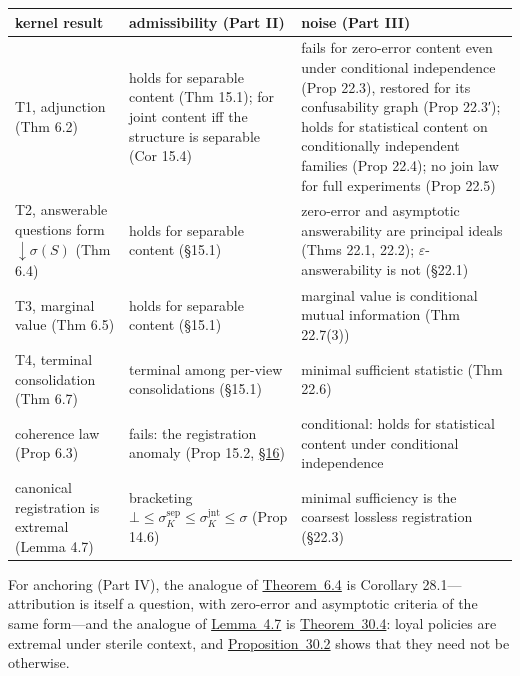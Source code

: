 {\def\LTcaptype{none} %
\begin{longtable}[]{@{}
  >{\raggedright\arraybackslash}p{}
  >{\raggedright\arraybackslash}p{}
  >{\raggedright\arraybackslash}p{}@{}}
\toprule\noalign{}
\begin{minipage}[b]{\linewidth}\raggedright
kernel result
\end{minipage} & \begin{minipage}[b]{\linewidth}\raggedright
admissibility (Part II)
\end{minipage} & \begin{minipage}[b]{\linewidth}\raggedright
noise (Part III)
\end{minipage} \\
\midrule\noalign{}
\endhead
\bottomrule\noalign{}
\endlastfoot
T1, adjunction (Thm 6.2) & holds for separable content (Thm 15.1); for joint content iff the structure is separable (Cor 15.4) & fails for zero-error content even under conditional independence (Prop 22.3), restored for its confusability graph (Prop 22.3′); holds for statistical content on conditionally independent families (Prop 22.4); no join law for full experiments (Prop 22.5) \\
T2, answerable questions form \({\downarrow}\sigma(S)\) (Thm 6.4) & holds for separable content (§15.1) & zero-error and asymptotic answerability are principal ideals (Thms 22.1, 22.2); \(\varepsilon\)-answerability is not (§22.1) \\
T3, marginal value (Thm 6.5) & holds for separable content (§15.1) & marginal value is conditional mutual information (Thm 22.7(3)) \\
T4, terminal consolidation (Thm 6.7) & terminal among per-view consolidations (§15.1) & minimal sufficient statistic (Thm 22.6) \\
coherence law (Prop 6.3) & fails: the registration anomaly (Prop 15.2, \hyperlink{sec:16}{§16}) & conditional: holds for statistical content under conditional independence \\
canonical registration is extremal (Lemma 4.7) & bracketing \(\bot \le \sigma^{\mathrm{sep}}_K \le \sigma^{\mathrm{jnt}}_K \le \sigma\) (Prop 14.6) & minimal sufficiency is the coarsest lossless registration (§22.3) \\
\end{longtable}
}

For anchoring (Part IV), the analogue of \hyperlink{stmt:6.4}{Theorem~6.4} is Corollary 28.1---\hspace{0pt}attribution is itself a question, with zero-error and asymptotic criteria of the same form---\hspace{0pt}and the analogue of \hyperlink{stmt:4.7}{Lemma~4.7} is \hyperlink{stmt:30.4}{Theorem~30.4}: loyal policies are extremal under sterile context, and \hyperlink{stmt:30.2}{Proposition~30.2} shows that they need not be otherwise.

